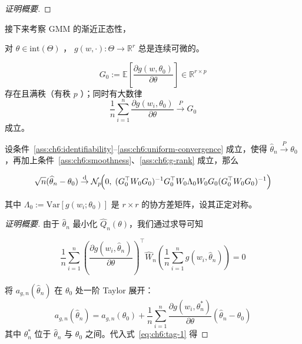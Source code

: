 \begin{remark}
\begin{proof}[证明概要]
\end{proof}

接下来考察 GMM 的渐近正态性，

\begin{assumption}[光滑性]\label{ass:ch6:smoothness}

对 $\theta\in\mathrm{int}(\Theta)$ ， $g(w,\cdot):\Theta\to \mathbb R^r$ 总是连续可微的。

\end{assumption}

\begin{assumption}[满秩]\label{ass:ch6:g-rank}

$$G_0:=\mathbb{E}\left[\frac{\partial g(w,\theta_0)}{\partial \theta}\right]\in\mathbb R^{r\times p}$$ 存在且满秩（有秩 $p$ ）；同时有大数律 $$\frac1n\sum_{i=1}^n\frac{\partial g(w_i,\theta_0)}{\partial \theta}\overset{P}\to G_0$$ 成立。

\end{assumption}

\begin{theorem}
\label{thm:ch6:gmm-asymptotic-normality}

设条件~\ref{ass:ch6:identifiability}--\ref{ass:ch6:uniform-convergence} 成立，使得 $\widehat\theta_n\overset P\to\theta_0$，再加上条件~\ref{ass:ch6:smoothness}、\ref{ass:ch6:g-rank} 成立，那么 

$$\sqrt{n}(\widehat{\theta}_n - \theta_0) \overset{\rm d}\to \mathcal{N}_p\!\Big(0,\; (G_0^\top W_0 G_0)^{-1} G_0^\top W_0 \Lambda_0 W_0 G_0 (G_0^\top W_0 G_0)^{-1} \Big)$$

其中 $\Lambda_0 := \mathrm{Var}[g(w_i;\theta_0)]$ 是 $r\times r$ 的协方差矩阵，设其正定对称。

\end{theorem}

\begin{proof}[证明概要]
由于 $\widehat{\theta}_n$ 最小化 $\widehat Q_n(\theta)$，我们通过求导可知

\begin{equation}
\label{eq:ch6:tag-1}
\frac{1}{n}\sum_{i=1}^n \left(\frac{\partial g(w_i,\widehat{\theta}_n)}{\partial\theta} \right)^\top\widehat{W}_n \left( \frac{1}{n}\sum_{i=1}^n g(w_i,\widehat{\theta}_n) \right) = 0
\end{equation}

将 $a_{g,n}(\widehat{\theta}_n)$ 在 $\theta_0$ 处一阶 Taylor 展开：
\[a_{g,n}(\widehat{\theta}_n) = a_{g,n}(\theta_0) + \frac{1}{n}\sum_{i=1}^n \frac{\partial g(w_i,\theta_n^*)}{\partial \theta} (\widehat{\theta}_n - \theta_0)\]
其中 $\theta_n^*$ 位于 $\widehat{\theta}_n$ 与 $\theta_0$ 之间。代入式~\eqref{eq:ch6:tag-1} 得


\end{proof}
\end{remark}
